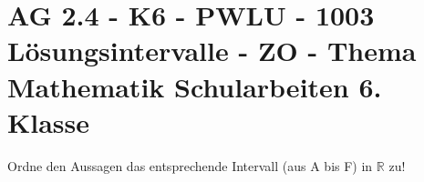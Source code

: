 \section{AG 2.4 - K6 - PWLU - 1003 Lösungsintervalle - ZO - Thema Mathematik Schularbeiten 6. Klasse}

\begin{beispiel}[K6 - PWLU]{1} %
			Ordne den Aussagen das entsprechende Intervall (aus A bis F) in $\mathbb{R}$ zu!\leer
			
			\zuordnen{
							R1={$x>-1$ und $x<3$},				%
							R2={$x<-1$ und $x\leq3$},				%
							R3={$x\geq 3$ und $x>-1$},				%
							R4={$x<3$ und $x\geq -1$},				%
							A={$(-1;3)$}, 				%
							B={$[-1;3]$}, 				%
							C={$[-1;3)$}, 				%
							D={$(-1;3]$}, 				%
							E={$(-\infty;-1)$}, 				%
							F={$[3;\infty)$}, 				%
							A1={A},				%
							A2={E},				%
							A3={F},				%
							A4={C},				%
							}
			\end{beispiel}